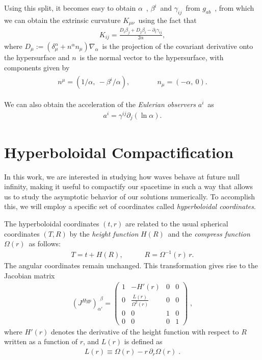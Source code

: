 Using this split, it becomes easy to obtain $\alpha$~, $\beta^i$~and $\gamma_{ij}$~from $g_{ab}$~, from which we can obtain the extrinsic curvature $K_{\mu\nu}$~using the fact that
%
\begin{align}
 K_{ij} = \frac{D_i \beta_j + D_j \beta_i - \partial_t \gamma_{ij}}{2 \alpha},
\end{align}
%
where $D_\mu := (\delta^\alpha_\mu + n^\alpha n_\mu) \nabla_\alpha$~is the projection of the covariant derivative onto the hypersurface and $n$~is the normal vector to the hypersurface, with components given by
%
\begin{align}
    \begin{aligned}
        n^\mu = (1/\alpha,~-\beta^i/\alpha), 
        & \quad \quad \quad n_\mu = (-\alpha,~0).
    \end{aligned}
\end{align}

We can also obtain the acceleration of the \textit{Eulerian observers} $a^i$~as
\begin{align}
 a^i = \gamma^{ij} \partial_j(\ln \alpha).
\end{align}


\section{Hyperboloidal Compactification}
\label{section:compactification}

In this work, we are interested in studying how waves behave at future null infinity, making it useful to compactify our spacetime in such a way that allows us to study the asymptotic behavior of our solutions numerically. To accomplish this, we will employ a specific set of coordinates called \textit{hyperboloidal coordinates}. 

The hyperboloidal coordinates $(t, r)$ are related to the usual spherical coordinates $(T, R)$ by the \textit{height function} $H(R)$~and the \textit{compress function} $\Omega(r)$~as follows:
%
\begin{align}
 T = t + H(R), 
     \quad \quad \quad R = \Omega^{-1}(r) \, r.
\end{align}
%
The angular coordinates remain unchanged. This transformation gives rise to the Jacobian matrix
%
\begin{align}
    \left(J^{Hyp}\right)_{\alpha'}^{\ \ \beta} = 
    \begin{pmatrix}
        1 & -H'(r) & 0 & 0 \\
        0 & \frac{L(r)}{\Omega^2(r)} & 0 & 0 \\
        0 & 0 & 1 & 0 \\
        0 & 0 & 0 & 1
    \end{pmatrix} \; ,
\end{align}
%
where $H'(r)$ denotes the derivative of the height function with respect to $R$ written as a function of $r$, and $L(r)$ is defined as
%
\begin{align}
 L(r) \equiv \Omega(r) - r \, \partial_r \Omega(r) \; .
\end{align}

